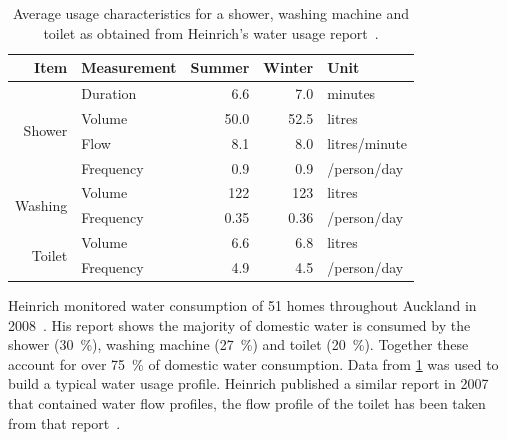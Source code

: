     \begin{table}
      \centering
      \begin{tabular}{r l|r|r|l}
        Item                    & Measurement & Summer & Winter & Unit\\
        \hline\hline
        \multirow{4}{*}{Shower} & Duration    & 6.6    & 7.0    & minutes\\
                                & Volume      & 50.0   & 52.5   & litres\\
                                & Flow        & 8.1    & 8.0    & litres/minute\\
                                & Frequency   & 0.9    & 0.9    & /person/day\\
        \hline
        \multirow{2}{*}{Washing}& Volume      & 122    & 123    & litres\\
                                & Frequency   & 0.35   & 0.36   & /person/day\\
        \hline
        \multirow{2}{*}{Toilet} & Volume      & 6.6    & 6.8    & litres\\
                                & Frequency   & 4.9    & 4.5    & /person/day\\
      \end{tabular}
      \caption{
          \label{tab:consumption_figures}
          Average usage characteristics for a shower, washing machine and toilet as obtained from Heinrich's water usage report~\cite{Heinrich2008}.
        }
    \end{table}
    Heinrich monitored water consumption of 51 homes throughout Auckland in 2008~\cite{Heinrich2008}.
    His report shows the majority of domestic water is consumed by the shower (\SI{30}{\percent}), washing machine (\SI{27}{\percent}) and toilet (\SI{20}{\percent}).
    Together these account for over \SI{75}{\percent} of domestic water consumption.
    Data from \cref{tab:consumption_figures} was used to build a typical water usage profile.
    Heinrich published a similar report in 2007 that contained water flow profiles, the flow profile of the toilet has been taken from that report~\cite{Heinrich2007}.

